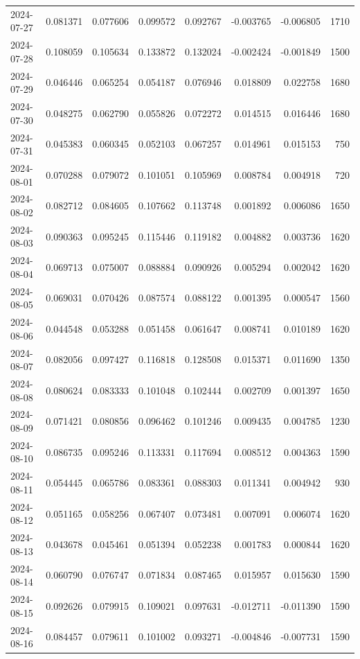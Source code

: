 \begin{tabular}{lrrrrrrr}
2024-07-27 & 0.081371 & 0.077606 & 0.099572 & 0.092767 & -0.003765 & -0.006805 & 1710 \\
2024-07-28 & 0.108059 & 0.105634 & 0.133872 & 0.132024 & -0.002424 & -0.001849 & 1500 \\
2024-07-29 & 0.046446 & 0.065254 & 0.054187 & 0.076946 & 0.018809 & 0.022758 & 1680 \\
2024-07-30 & 0.048275 & 0.062790 & 0.055826 & 0.072272 & 0.014515 & 0.016446 & 1680 \\
2024-07-31 & 0.045383 & 0.060345 & 0.052103 & 0.067257 & 0.014961 & 0.015153 & 750 \\
2024-08-01 & 0.070288 & 0.079072 & 0.101051 & 0.105969 & 0.008784 & 0.004918 & 720 \\
2024-08-02 & 0.082712 & 0.084605 & 0.107662 & 0.113748 & 0.001892 & 0.006086 & 1650 \\
2024-08-03 & 0.090363 & 0.095245 & 0.115446 & 0.119182 & 0.004882 & 0.003736 & 1620 \\
2024-08-04 & 0.069713 & 0.075007 & 0.088884 & 0.090926 & 0.005294 & 0.002042 & 1620 \\
2024-08-05 & 0.069031 & 0.070426 & 0.087574 & 0.088122 & 0.001395 & 0.000547 & 1560 \\
2024-08-06 & 0.044548 & 0.053288 & 0.051458 & 0.061647 & 0.008741 & 0.010189 & 1620 \\
2024-08-07 & 0.082056 & 0.097427 & 0.116818 & 0.128508 & 0.015371 & 0.011690 & 1350 \\
2024-08-08 & 0.080624 & 0.083333 & 0.101048 & 0.102444 & 0.002709 & 0.001397 & 1650 \\
2024-08-09 & 0.071421 & 0.080856 & 0.096462 & 0.101246 & 0.009435 & 0.004785 & 1230 \\
2024-08-10 & 0.086735 & 0.095246 & 0.113331 & 0.117694 & 0.008512 & 0.004363 & 1590 \\
2024-08-11 & 0.054445 & 0.065786 & 0.083361 & 0.088303 & 0.011341 & 0.004942 & 930 \\
2024-08-12 & 0.051165 & 0.058256 & 0.067407 & 0.073481 & 0.007091 & 0.006074 & 1620 \\
2024-08-13 & 0.043678 & 0.045461 & 0.051394 & 0.052238 & 0.001783 & 0.000844 & 1620 \\
2024-08-14 & 0.060790 & 0.076747 & 0.071834 & 0.087465 & 0.015957 & 0.015630 & 1590 \\
2024-08-15 & 0.092626 & 0.079915 & 0.109021 & 0.097631 & -0.012711 & -0.011390 & 1590 \\
2024-08-16 & 0.084457 & 0.079611 & 0.101002 & 0.093271 & -0.004846 & -0.007731 & 1590 \\

\end{tabular}
